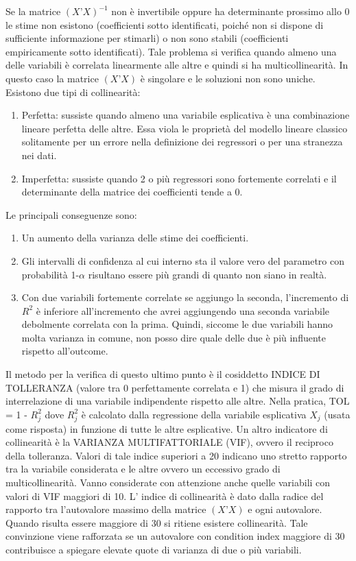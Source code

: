 \documentclass[a4page, 11pt]{article}
\begin{document}
Se la matrice $(X’X)^{-1}$ non è invertibile oppure ha determinante prossimo allo 0 le stime non esistono (coefficienti sotto identificati, poiché non si dispone di sufficiente informazione per stimarli) o non sono stabili (coefficienti empiricamente sotto identificati).
\newline
Tale problema si verifica quando almeno una delle variabili è correlata linearmente alle altre e quindi si ha multicollinearità. In questo caso la matrice $(X’X)$ è singolare e le soluzioni non sono uniche. 
\newline
\newline
Esistono due tipi di collinearità:
\begin{enumerate}[noitemsep]
\item Perfetta: sussiste quando almeno una variabile esplicativa è una combinazione lineare perfetta delle altre. Essa viola le proprietà del modello lineare classico solitamente per un errore nella definizione dei regressori o per una stranezza nei dati.
\item Imperfetta: sussiste quando 2 o più regressori sono fortemente correlati e il determinante della matrice dei coefficienti tende a 0.
\end{enumerate}
Le principali conseguenze sono:
\begin{enumerate}[noitemsep]
\item Un aumento della varianza delle stime dei coefficienti.
\item Gli intervalli di confidenza al cui interno sta il valore vero del parametro con probabilità 1-$\alpha$ risultano essere più grandi di quanto non siano in realtà.
\item Con due variabili fortemente correlate se aggiungo la seconda, l’incremento di $R^{2}$ è inferiore all’incremento che avrei aggiungendo una seconda variabile debolmente correlata con la prima. Quindi, siccome le due variabili hanno molta varianza in comune, non posso dire quale delle due è più influente rispetto all’outcome.
\end{enumerate}
Il metodo per la verifica di questo ultimo punto è il cosiddetto INDICE DI TOLLERANZA (valore tra 0 perfettamente correlata e 1) che misura il grado di interrelazione di una variabile indipendente rispetto alle altre. Nella pratica, TOL = 1 - $R^{2}_j$ dove $R^{2}_j$ è calcolato dalla regressione della variabile esplicativa $X_j$ (usata come risposta) in funzione di tutte le altre esplicative.
\newline
Un altro indicatore di collinearità è la VARIANZA MULTIFATTORIALE (VIF), ovvero il reciproco della tolleranza. Valori di tale indice superiori a 20 indicano uno stretto rapporto tra la variabile considerata e le altre ovvero un eccessivo grado di multicollinearità. Vanno considerate con attenzione anche quelle variabili con valori di VIF maggiori di 10.
\newline
L’ indice di collinearità è dato dalla radice del rapporto tra l’autovalore massimo della matrice $(X’X)$ e ogni autovalore. Quando risulta essere maggiore di 30 si ritiene esistere collinearità. Tale convinzione viene rafforzata se un autovalore con condition index maggiore di 30 contribuisce a spiegare elevate quote di varianza di due o più variabili.
\end{document}
